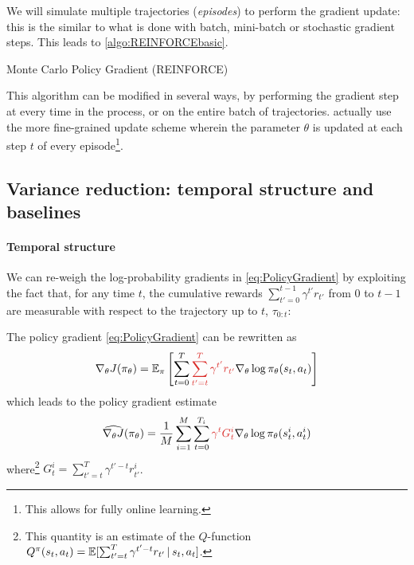 \documentclass[../course-notes.tex]{subfiles}
\begin{document}
We will simulate multiple trajectories (\textit{episodes}) to perform the gradient update: this is the similar to what is done with batch, mini-batch or stochastic gradient steps. This leads to \cref{algo:REINFORCEbasic}.

\begin{algorithm}[H]
	\caption{Monte Carlo Policy Gradient (REINFORCE)}\label{algo:REINFORCEbasic}
\end{algorithm}

This algorithm can be modified in several ways, by performing the gradient step at every time in the process, or on the entire batch of trajectories. \textcite{Sutton1998} actually use the more fine-grained update scheme wherein the parameter $\theta$ is updated at each step $t$ of every episode\footnote{This allows for fully online learning.}.

\subsection{Variance reduction: temporal structure and baselines}

\paragraph{Temporal structure} We can re-weigh the log-probability gradients in \cref{eq:PolicyGradient} by exploiting the fact that, for any time $t$, the cumulative rewards $\sum_{t'=0}^{t-1} \gamma^{t'} r_{t'}$ from $0$ to $t-1$ are measurable with respect to the trajectory up to $t$, $\tau_{0:t}$:
\begin{prop}
	The policy gradient \eqref{eq:PolicyGradient} can be rewritten as
	\begin{equation}
	\nabla_\theta J(\pi_\theta) =
	\EE_\pi \left[
	\sum_{t=0}^T
	{\redfont
		\sum_{t'=t}^T \gamma^{t'} r_{t'}
	}
	\nabla_\theta \log\pi_\theta(s_t,a_t)
	\right]
	\end{equation}
	which leads to the policy gradient estimate
	\begin{equation}
	\widehat{\nabla_\theta J}(\pi_\theta) =
	\frac{1}{M}\sum_{i=1}^M
	\sum_{t=0}^{T_i}
	{\redfont \gamma^t G^i_t}
	\nabla_\theta \log\pi_\theta (s_t^i, a_t^i)
	\end{equation}
	where\footnote{This quantity is an estimate of the $Q$-function $Q^\pi(s_t, a_t) = \operatorname{\mathbb{E}} [\sum_{t'=t}^T \gamma^{t'-t} r_{t'} \,|\, s_{t}, a_{t} ]$.} $G^i_t = \sum_{t'=t}^T \gamma^{t'-t} r^i_{t'}$.
\end{prop}
\end{document}
